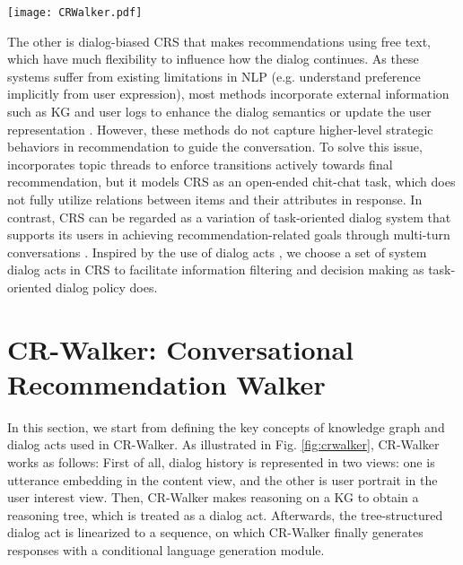 \documentclass[11pt]{article}
\begin{document}
\begin{figure*}[htb]
  \centering
  \texttt{[image: CRWalker.pdf]}
  \caption{Left: Illustration of CR-Walker's overall architecture. CR-Walker first decides the system intent and then applies walker cells to perform tree-structured reasoning on the knowledge graph in two stages. The transformed dialog acts are used to guide response generation. Right: Detailed structure for a single walker cell. A walker cell calculates the similarity between the entities on a graph and the context embedding that integrates utterance embedding and user portrait. Entity selection is learned by logistic regression to enable multiple selections.}
  \label{fig:crwalker}
\end{figure*}

The other is dialog-biased CRS \cite{li2018towards,kang2019recommendation,liao2019deep,liu2020towards} that makes recommendations using free text, which have much flexibility to influence how the dialog continues. 
As these systems suffer from existing limitations in NLP (e.g. understand preference implicitly from user expression), most methods incorporate external information such as KG and user logs to enhance the dialog semantics \cite{yu2019visual,zhou2020improving} or update the user representation \cite{zhang2019text,chen2019towards}. However, these methods do not capture higher-level strategic behaviors in recommendation to guide the conversation.
To solve this issue, \citet{zhou2020towards} incorporates topic threads to enforce transitions actively towards final recommendation, but it models CRS as an open-ended chit-chat task, which does not fully utilize relations between items and their attributes in response.
In contrast, CRS can be regarded as a variation of task-oriented dialog system that supports its users in achieving recommendation-related goals through multi-turn conversations \cite{tran2020deep}. 
Inspired by the use of dialog acts \cite{traum1999speech}, we choose a set of system dialog acts in CRS to facilitate information filtering and decision making as task-oriented dialog policy \cite{takanobu2019guided,takanobu2020multi} does.

\section{CR-Walker: Conversational Recommendation Walker}
In this section, we start from defining the key concepts of knowledge graph and dialog acts used in CR-Walker. As illustrated in Fig. \ref{fig:crwalker}, CR-Walker works as follows: First of all, dialog history is represented in two views: one is utterance embedding in the content view, 
and the other is user portrait in the user interest view.
Then, CR-Walker makes reasoning on a KG to obtain a reasoning tree, which is treated as a dialog act. Afterwards, the tree-structured dialog act is linearized to a sequence, on which CR-Walker finally generates responses with a conditional language generation module. 
\end{document}
